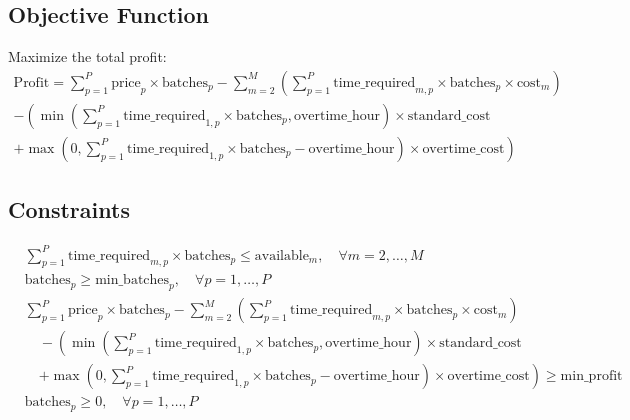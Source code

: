 \documentclass{article}
\begin{document}
\subsection*{Objective Function}
Maximize the total profit:
\begin{align*}
    \text{Profit} = \sum_{p=1}^{P} \text{price}_{p} \times \text{batches}_{p} - \sum_{m=2}^{M} \left( \sum_{p=1}^{P} \text{time\_required}_{m,p} \times \text{batches}_{p} \times \text{cost}_{m} \right) \\
    - \left( \min\left(\sum_{p=1}^{P} \text{time\_required}_{1,p} \times \text{batches}_{p}, \text{overtime\_hour}\right) \times \text{standard\_cost} \right. \\
    \left. + \max\left(0, \sum_{p=1}^{P} \text{time\_required}_{1,p} \times \text{batches}_{p} - \text{overtime\_hour}\right) \times \text{overtime\_cost} \right)
\end{align*}

\subsection*{Constraints}
\begin{align*}
    & \sum_{p=1}^{P} \text{time\_required}_{m,p} \times \text{batches}_{p} \leq \text{available}_{m}, \quad \forall m = 2, \ldots, M \\
    & \text{batches}_{p} \geq \text{min\_batches}_{p}, \quad \forall p = 1, \ldots, P \\
    & \sum_{p=1}^{P} \text{price}_{p} \times \text{batches}_{p} - \sum_{m=2}^{M} \left( \sum_{p=1}^{P} \text{time\_required}_{m,p} \times \text{batches}_{p} \times \text{cost}_{m} \right) \\
    & \quad - \left( \min\left(\sum_{p=1}^{P} \text{time\_required}_{1,p} \times \text{batches}_{p}, \text{overtime\_hour}\right) \times \text{standard\_cost} \right. \\
    & \quad \left. + \max\left(0, \sum_{p=1}^{P} \text{time\_required}_{1,p} \times \text{batches}_{p} - \text{overtime\_hour}\right) \times \text{overtime\_cost} \right) \geq \text{min\_profit} \\
    & \text{batches}_{p} \geq 0, \quad \forall p = 1, \ldots, P
\end{align*}
\end{document}
